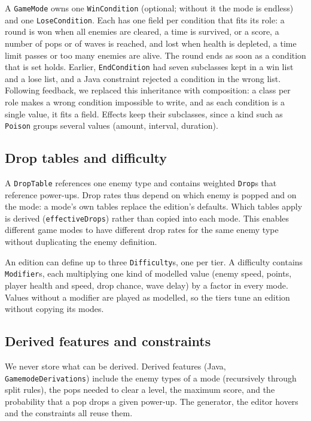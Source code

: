 \documentclass[conference]{IEEEtran}
\begin{document}
A \texttt{GameMode} owns one \texttt{WinCondition} (optional; without it the mode is endless) and one
\texttt{LoseCondition}. Each has one field per condition that fits its role: a round is won when all
enemies are cleared, a time is survived, or a score, a number of pops or of waves is reached, and lost
when health is depleted, a time limit passes or too many enemies are alive. The round ends as soon as
a condition that is set holds. Earlier, \texttt{EndCondition} had seven subclasses kept in a win list
and a lose list, and a Java constraint rejected a condition in the wrong list. Following feedback, we
replaced this inheritance with composition: a class per role makes a wrong condition impossible to
write, and as each condition is a single value, it fits a field. Effects keep their subclasses, since
a kind such as \texttt{Poison} groups several values (amount, interval, duration).

\subsection{Drop tables and difficulty}
A \texttt{DropTable} references one enemy type and contains weighted \texttt{Drop}s that reference
power-ups. Drop rates thus depend on which enemy is popped and on the mode: a mode's own tables
replace the edition's defaults. Which tables apply is derived (\texttt{effectiveDrops}) rather than
copied into each mode. This enables different game modes to have different drop rates for the same enemy type without duplicating the enemy definition.

An edition can define up to three \texttt{Difficulty}s, one per tier. A difficulty contains
\texttt{Modifier}s, each multiplying one kind of modelled value (enemy speed, points, player health
and speed, drop chance, wave delay) by a factor in every mode. Values without a modifier are played
as modelled, so the tiers tune an edition without copying its modes.

\subsection{Derived features and constraints}
We never store what can be derived. Derived features (Java, \texttt{GamemodeDerivations}) include the
enemy types of a mode (recursively through split rules), the pops needed to clear a level, the
maximum score, and the probability that a pop drops a given power-up. The generator, the editor
hovers and the constraints all reuse them.
\end{document}
